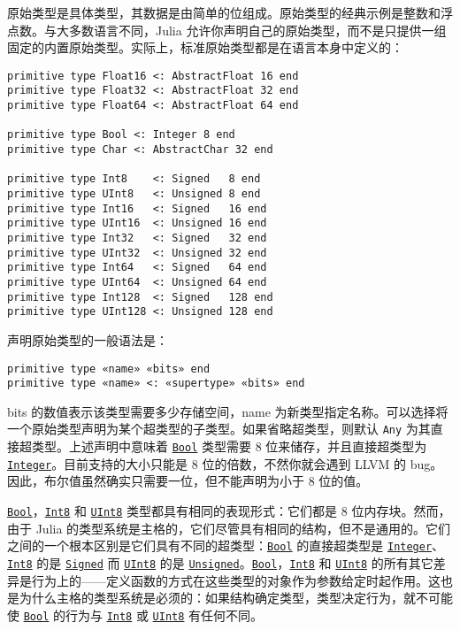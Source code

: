 原始类型是具体类型，其数据是由简单的位组成。原始类型的经典示例是整数和浮点数。与大多数语言不同，Julia 允许你声明自己的原始类型，而不是只提供一组固定的内置原始类型。实际上，标准原始类型都是在语言本身中定义的：




\begin{verbatim}
primitive type Float16 <: AbstractFloat 16 end
primitive type Float32 <: AbstractFloat 32 end
primitive type Float64 <: AbstractFloat 64 end

primitive type Bool <: Integer 8 end
primitive type Char <: AbstractChar 32 end

primitive type Int8    <: Signed   8 end
primitive type UInt8   <: Unsigned 8 end
primitive type Int16   <: Signed   16 end
primitive type UInt16  <: Unsigned 16 end
primitive type Int32   <: Signed   32 end
primitive type UInt32  <: Unsigned 32 end
primitive type Int64   <: Signed   64 end
primitive type UInt64  <: Unsigned 64 end
primitive type Int128  <: Signed   128 end
primitive type UInt128 <: Unsigned 128 end
\end{verbatim}



声明原始类型的一般语法是：




\begin{lstlisting}
primitive type «name» «bits» end
primitive type «name» <: «supertype» «bits» end
\end{lstlisting}



bits 的数值表示该类型需要多少存储空间，name 为新类型指定名称。可以选择将一个原始类型声明为某个超类型的子类型。如果省略超类型，则默认 \texttt{Any} 为其直接超类型。上述声明中意味着 \hyperlink{46725311238864537}{\texttt{Bool}} 类型需要 8 位来储存，并且直接超类型为 \hyperlink{8469131683393450448}{\texttt{Integer}}。目前支持的大小只能是 8 位的倍数，不然你就会遇到 LLVM 的 bug。因此，布尔值虽然确实只需要一位，但不能声明为小于 8 位的值。



\hyperlink{46725311238864537}{\texttt{Bool}}，\hyperlink{5857518405103968275}{\texttt{Int8}} 和 \hyperlink{6609065134969660118}{\texttt{UInt8}} 类型都具有相同的表现形式：它们都是 8 位内存块。然而，由于 Julia 的类型系统是主格的，它们尽管具有相同的结构，但不是通用的。它们之间的一个根本区别是它们具有不同的超类型：\hyperlink{46725311238864537}{\texttt{Bool}} 的直接超类型是 \hyperlink{8469131683393450448}{\texttt{Integer}}、\hyperlink{5857518405103968275}{\texttt{Int8}} 的是 \hyperlink{14154866400772377486}{\texttt{Signed}} 而 \hyperlink{6609065134969660118}{\texttt{UInt8}} 的是 \hyperlink{4780971278803506664}{\texttt{Unsigned}}。\hyperlink{46725311238864537}{\texttt{Bool}}，\hyperlink{5857518405103968275}{\texttt{Int8}} 和 \hyperlink{6609065134969660118}{\texttt{UInt8}} 的所有其它差异是行为上的——定义函数的方式在这些类型的对象作为参数给定时起作用。这也是为什么主格的类型系统是必须的：如果结构确定类型，类型决定行为，就不可能使 \hyperlink{46725311238864537}{\texttt{Bool}} 的行为与 \hyperlink{5857518405103968275}{\texttt{Int8}} 或 \hyperlink{6609065134969660118}{\texttt{UInt8}} 有任何不同。



